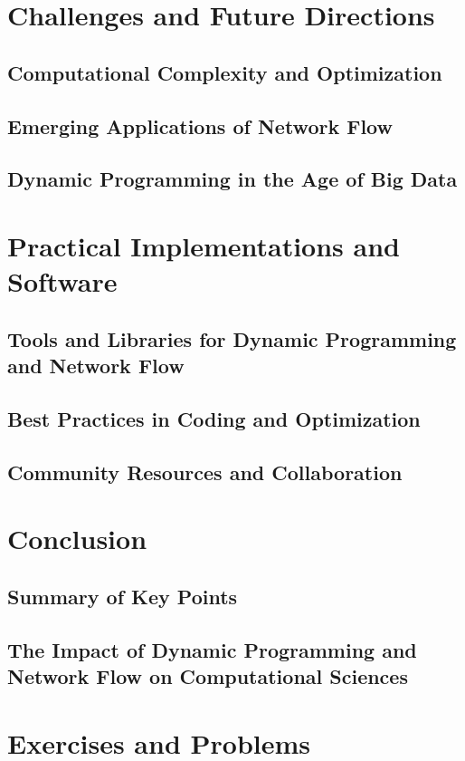 \documentclass[12pt]{book} %
\begin{document}
\section{Challenges and Future Directions}
\subsection{Computational Complexity and Optimization}
\subsection{Emerging Applications of Network Flow}
\subsection{Dynamic Programming in the Age of Big Data}

\section{Practical Implementations and Software}
\subsection{Tools and Libraries for Dynamic Programming and Network Flow}
\subsection{Best Practices in Coding and Optimization}
\subsection{Community Resources and Collaboration}

\section{Conclusion}
\subsection{Summary of Key Points}
\subsection{The Impact of Dynamic Programming and Network Flow on Computational Sciences}

\section{Exercises and Problems}
\end{document}
